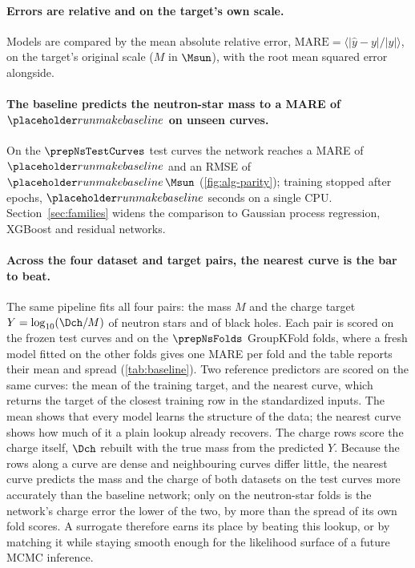 \paragraph{Errors are relative and on the target's own scale.}
Models are compared by the mean absolute relative error, $\mathrm{MARE} = \langle |\hat{y} - y| / |y| \rangle$, on the target's original scale ($M$ in $\Msun$), with the root mean squared error alongside.

\paragraph{The baseline predicts the neutron-star mass to a MARE of $\baseNsMassMare$ on unseen curves.}
On the $\prepNsTestCurves$ test curves the network reaches a MARE of $\baseNsMassMare$ and an RMSE of $\baseNsMassRmse\,\Msun$ (\cref{fig:alg-parity}); training stopped after \baseNsMassEpochs{} epochs, $\baseNsMassFitSeconds$ seconds on a single CPU. Section~\ref{sec:families} widens the comparison to Gaussian process regression, XGBoost and residual networks.

\paragraph{Across the four dataset and target pairs, the nearest curve is the bar to beat.}
The same pipeline fits all four pairs: the mass $M$ and the charge target $Y = \log_{10}(\Dch/M)$ of neutron stars and of black holes. Each pair is scored on the frozen test curves and on the $\prepNsFolds$ GroupKFold folds, where a fresh model fitted on the other folds gives one MARE per fold and the table reports their mean and spread (\cref{tab:baseline}). Two reference predictors are scored on the same curves: the mean of the training target, and the nearest curve, which returns the target of the closest training row in the standardized inputs. The mean shows that every model learns the structure of the data; the nearest curve shows how much of it a plain lookup already recovers. The charge rows score the charge itself, $\Dch$ rebuilt with the true mass from the predicted $Y$. Because the rows along a curve are dense and neighbouring curves differ little, the nearest curve predicts the mass and the charge of both datasets on the test curves more accurately than the baseline network; only on the neutron-star folds is the network's charge error the lower of the two, by more than the spread of its own fold scores. A surrogate therefore earns its place by beating this lookup, or by matching it while staying smooth enough for the likelihood surface of a future MCMC inference.

